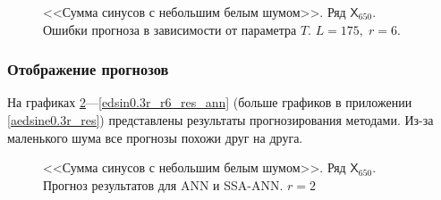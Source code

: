 \documentclass[specialist,
               substylefile = spbu.rtx,
               subf,href,colorlinks=true, 12p]{disser}
\newcommand{\multiref}[2]{\ref{#1}---\ref{#2}}
\begin{document}
\begin{figure}[H]
	\captionsetup{justification=centering}
	\caption{<<Сумма синусов с небольшим белым шумом>>. Ряд $\mathsf{X}_{650}$. Ошибки прогноза в зависимости от параметра $T$. $L = 175, \; r = 6$.}
	\label{edsin0.3r_r6}
\end{figure}

\subsubsection{Отображение прогнозов}
\label{edsine0.3r_res}

На графиках \multiref{edsin0.3r_r2_res_ann}{edsin0.3r_r6_res_ann} (больше графиков в приложении \ref{aedsine0.3r_res}) представлены результаты прогнозирования методами. Из-за маленького шума все прогнозы похожи друг на друга.

\begin{figure}[H]
	\captionsetup{justification=centering}
	\caption{<<Сумма синусов с небольшим белым шумом>>. Ряд $\mathsf{X}_{650}$. Прогноз результатов для ANN и SSA-ANN. $r = 2$}
	\label{edsin0.3r_r2_res_ann}
\end{figure}
\end{document}
